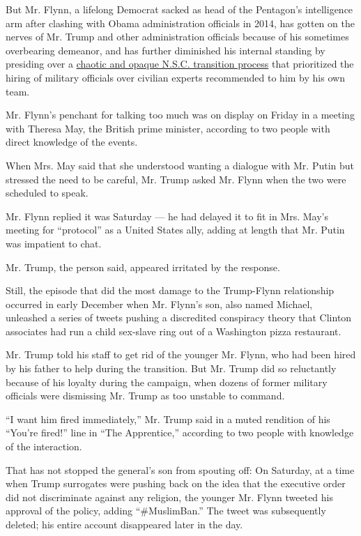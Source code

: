 But Mr. Flynn, a lifelong Democrat sacked as head of the Pentagon's
intelligence arm after clashing with Obama administration officials in
2014, has gotten on the nerves of Mr. Trump and other administration
officials because of his sometimes overbearing demeanor, and has further
diminished his internal standing by presiding over a
\href{https://www.nytimes.com/2017/01/18/us/politics/trump-team-has-barely-engaged-with-national-security-council.html}{chaotic
and opaque N.S.C. transition process} that prioritized the hiring of
military officials over civilian experts recommended to him by his own
team.

Mr. Flynn's penchant for talking too much was on display on Friday in a
meeting with Theresa May, the British prime minister, according to two
people with direct knowledge of the events.

When Mrs. May said that she understood wanting a dialogue with Mr. Putin
but stressed the need to be careful, Mr. Trump asked Mr. Flynn when the
two were scheduled to speak.

Mr. Flynn replied it was Saturday --- he had delayed it to fit in Mrs.
May's meeting for ``protocol'' as a United States ally, adding at length
that Mr. Putin was impatient to chat.

Mr. Trump, the person said, appeared irritated by the response.

Still, the episode that did the most damage to the Trump-Flynn
relationship occurred in early December when Mr. Flynn's son, also named
Michael, unleashed a series of tweets pushing a discredited conspiracy
theory that Clinton associates had run a child sex-slave ring out of a
Washington pizza restaurant.

Mr. Trump told his staff to get rid of the younger Mr. Flynn, who had
been hired by his father to help during the transition. But Mr. Trump
did so reluctantly because of his loyalty during the campaign, when
dozens of former military officials were dismissing Mr. Trump as too
unstable to command.

``I want him fired immediately,'' Mr. Trump said in a muted rendition of
his ``You're fired!'' line in ``The Apprentice,'' according to two
people with knowledge of the interaction.

That has not stopped the general's son from spouting off: On Saturday,
at a time when Trump surrogates were pushing back on the idea that the
executive order did not discriminate against any religion, the younger
Mr. Flynn tweeted his approval of the policy, adding ``\#MuslimBan.''
The tweet was subsequently deleted; his entire account disappeared later
in the day.

